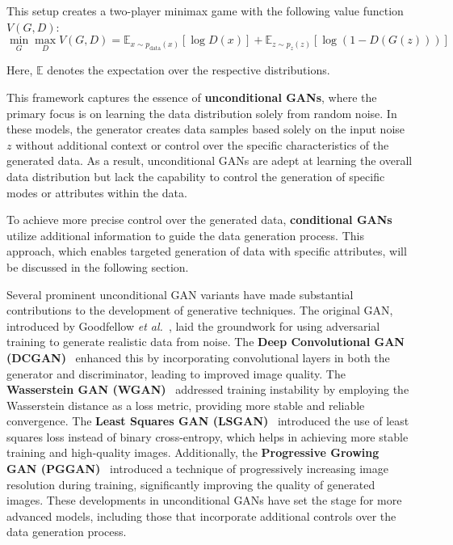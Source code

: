 \documentclass[12pt,DIV14,BCOR12mm,a4paper,footinclude=false,headinclude,parskip=half-,twoside,openright,cleardoublepage=empty,toc=index,bibliography=totoc,listof=totoc]{scrreprt}
\numberwithin{equation}{chapter}
\begin{document}
This setup creates a two-player minimax game with the following value function \( V(G, D) \):
\begin{equation}
\min_{G} \max_{D} V(G, D) = \mathbb{E}_{x \sim p_{\text{data}}(x)} [\log D(x)] + \mathbb{E}_{z \sim p_z(z)} [\log(1 - D(G(z)))]
\end{equation}

Here, \( \mathbb{E} \) denotes the expectation over the respective distributions.

This framework captures the essence of \textbf{unconditional GANs}, where the primary focus is on learning the data distribution solely from random noise. In these models, the generator creates data samples based solely on the input noise \( z \) without additional context or control over the specific characteristics of the generated data. As a result, unconditional GANs are adept at learning the overall data distribution but lack the capability to control the generation of specific modes or attributes within the data.

To achieve more precise control over the generated data, \textbf{conditional GANs} utilize additional information to guide the data generation process. This approach, which enables targeted generation of data with specific attributes, will be discussed in the following section.

Several prominent unconditional GAN variants have made substantial contributions to the development of generative techniques. The original GAN, introduced by Goodfellow \textit{et al.}~\cite{goodfellow2014generative}, laid the groundwork for using adversarial training to generate realistic data from noise. The \textbf{Deep Convolutional GAN (DCGAN)}~\cite{radford2015unsupervised} enhanced this by incorporating convolutional layers in both the generator and discriminator, leading to improved image quality. The \textbf{Wasserstein GAN (WGAN)}~\cite{arjovsky2017wasserstein} addressed training instability by employing the Wasserstein distance as a loss metric, providing more stable and reliable convergence. The \textbf{Least Squares GAN (LSGAN)}~\cite{mao2017least} introduced the use of least squares loss instead of binary cross-entropy, which helps in achieving more stable training and high-quality images. Additionally, the \textbf{Progressive Growing GAN (PGGAN)}~\cite{karras2017progressive} introduced a technique of progressively increasing image resolution during training, significantly improving the quality of generated images. These developments in unconditional GANs have set the stage for more advanced models, including those that incorporate additional controls over the data generation process.
\end{document}
